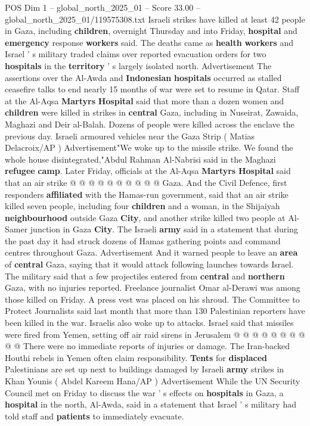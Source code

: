 \begin{textsample}{POS Dim 1 – global\_north\_2025\_01 – Score 33.00 – global\_north\_2025\_01/119575308.txt}  \label{ex:f1_pos_365}
Israeli strikes have killed at least 42 people in Gaza, including \textbf{children}, overnight Thursday and into Friday, \textbf{hospital} and \textbf{emergency} response \textbf{workers} said.
The deaths came as \textbf{health} \textbf{workers} and Israel ' s military traded claims over reported evacuation orders for two \textbf{hospitals} in the \textbf{territory} ' s largely isolated north.
Advertisement The assertions over the Al-Awda and \textbf{Indonesian} \textbf{hospitals} occurred as stalled ceasefire talks to end nearly 15 months of war were set to resume in Qatar.
Staff at the Al-Aqsa \textbf{Martyrs} \textbf{Hospital} said that more than a dozen women and \textbf{children} were killed in strikes in \textbf{central} Gaza, including in Nuseirat, Zawaida, Maghazi and Deir al-Balah.
Dozens of people were killed across the enclave the previous day.
Israeli armoured vehicles near the Gaza Strip ( Matias Delacroix/AP ) Advertisement"We woke up to the missile strike.
We found the whole house disintegrated,"Abdul Rahman Al-Nabrisi said in the Maghazi \textbf{refugee} \textbf{camp}.
Later Friday, officials at the Al-Aqsa \textbf{Martyrs} \textbf{Hospital} said that an air strike @ @ @ @ @ @ @ @ @ @ Gaza.
And the Civil Defence, first responders \textbf{affiliated} with the Hamas-run government, said that an air strike killed seven people, including four \textbf{children} and a woman, in the Shijaiyah \textbf{neighbourhood} outside Gaza \textbf{City}, and another strike killed two people at Al-Samer junction in Gaza \textbf{City}.
The Israeli \textbf{army} said in a statement that during the past day it had struck dozens of Hamas gathering points and command centres throughout Gaza.
Advertisement And it warned people to leave an \textbf{area} of \textbf{central} Gaza, saying that it would attack following launches towards Israel.
The military said that a few projectiles entered from \textbf{central} and \textbf{northern} Gaza, with no injuries reported.
Freelance journalist Omar al-Derawi was among those killed on Friday.
A press vest was placed on his shroud.
The Committee to Protect Journalists said last month that more than 130 Palestinian reporters have been killed in the war.
Israelis also woke up to attacks.
Israel said that missiles were fired from Yemen, setting off air raid sirens in Jerusalem @ @ @ @ @ @ @ @ @ @ There were no immediate reports of injuries or damage.
The Iran-backed Houthi rebels in Yemen often claim responsibility. \textbf{Tents} for \textbf{displaced} Palestinians are set up next to buildings damaged by Israeli \textbf{army} strikes in Khan Younis ( Abdel Kareem Hana/AP ) Advertisement While the UN Security Council met on Friday to discuss the war ' s effects on \textbf{hospitals} in Gaza, a \textbf{hospital} in the north, Al-Awda, said in a statement that Israel ' s military had told staff and \textbf{patients} to immediately evacuate.

\end{textsample}
